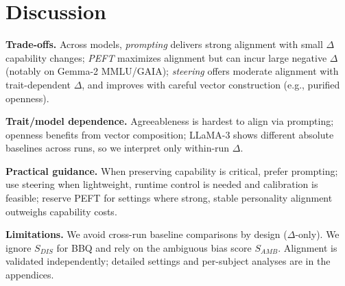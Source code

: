 \section{Discussion}

\textbf{Trade-offs.} Across models, \emph{prompting} delivers strong alignment with small \(\Delta\) capability changes; \emph{PEFT} maximizes alignment but can incur large negative \(\Delta\) (notably on Gemma-2 MMLU/GAIA); \emph{steering} offers moderate alignment with trait-dependent \(\Delta\), and improves with careful vector construction (e.g., purified openness).

\textbf{Trait/model dependence.} Agreeableness is hardest to align via prompting; openness benefits from vector composition; LLaMA-3 shows different absolute baselines across runs, so we interpret only within-run \(\Delta\).

\textbf{Practical guidance.} When preserving capability is critical, prefer prompting; use steering when lightweight, runtime control is needed and calibration is feasible; reserve PEFT for settings where strong, stable personality alignment outweighs capability costs.

\textbf{Limitations.} We avoid cross-run baseline comparisons by design (\(\Delta\)-only). We ignore \(S_{DIS}\) for BBQ and rely on the ambiguous bias score \(S_{AMB}\). Alignment is validated independently; detailed settings and per-subject analyses are in the appendices.